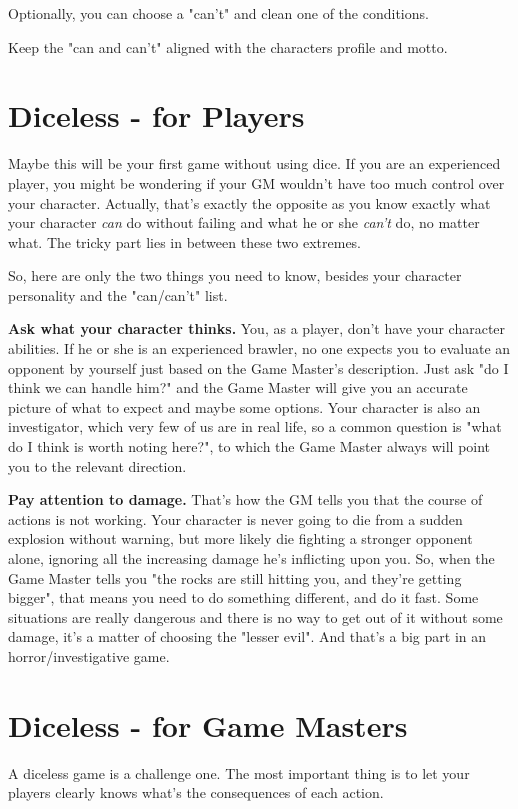 \documentclass[11pt]{article}
\begin{document}
Optionally, you can choose a "can't" and clean one of the conditions.

Keep the "can and can't" aligned with the characters profile and motto.

\section{Diceless - for Players}

Maybe this will be your first game without using dice. If you are an experienced player, you might be wondering if your GM wouldn't have too much control over your character. Actually, that's exactly the opposite as you know exactly what your character \textit{can} do without failing and what he or she \textit{can't} do, no matter what. The tricky part lies in between these two extremes.

So, here are only the two things you need to know, besides your character personality and the "can/can't" list.

\textbf{Ask what your character thinks.} You, as a player, don't have your character abilities. If he or she is an experienced brawler, no one expects you to evaluate an opponent by yourself just based on the Game Master's description. Just ask "do I think we can handle him?" and the Game Master will give you an accurate picture of what to expect and maybe some options. Your character is also an investigator, which very few of us are in real life, so a common question is "what do I think is worth noting here?", to which the Game Master always will point you to the relevant direction.

\textbf{Pay attention to damage.} That's how the GM tells you that the course of actions is not working. Your character is never going to die from a sudden explosion without warning, but more likely die fighting a stronger opponent alone, ignoring all the increasing damage he's inflicting upon you. So, when the Game Master tells you "the rocks are still hitting you, and they're getting bigger", that means you need to do something different, and do it fast. Some situations are really dangerous and there is no way to get out of it without some damage, it's a matter of choosing the "lesser evil". And that's a big part in an horror/investigative game.


\section{Diceless - for Game Masters}
\label{sec:org2563cf9}
A diceless game is a challenge one. The most important thing is to let your players clearly knows what's the consequences of each action.
\end{document}
